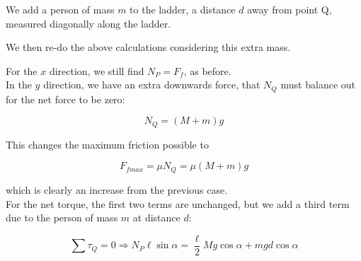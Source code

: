 We add a person of mass $m$ to the ladder, a distance $d$ away from point Q, measured diagonally along the ladder.

\begin{figure}[H]
  \centering
{}
\end{figure}

We then re-do the above calculations considering this extra mass.

For the $x$ direction, we still find $N_P = F_f$, as before.\\
In the $y$ direction, we have an extra downwards force, that $N_Q$ must balance out for the net force to be zero:

\begin{equation}
N_Q = (M + m) g
\end{equation}

This changes the maximum friction possible to

\begin{equation}
F_{fmax} = \mu N_Q = \mu (M + m) g
\end{equation}

which is clearly an increase from the previous case.\\
For the net torque, the first two terms are unchanged, but we add a third term due to the person of mass $m$ at distance $d$:

\begin{equation}
\sum \tau_Q = 0 \Rightarrow N_P \ell \sin \alpha = \frac{\ell}{2} M g \cos \alpha + m g d \cos \alpha
\end{equation}

